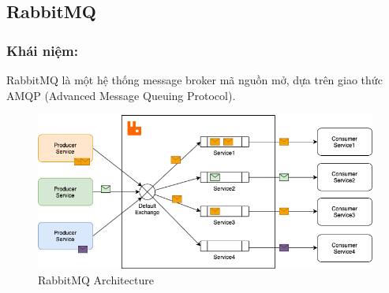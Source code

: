 \subsection{RabbitMQ}
\subsubsection{Khái niệm:}
\indent RabbitMQ là một hệ thống message broker mã nguồn mở, dựa trên giao thức AMQP (Advanced Message Queuing Protocol).
 \begin{figure}[H]
    \begin{center}
    \includegraphics[scale = 0.5]{images/chap-2-images/rabbitMQ.png}
    \vspace*{7mm}
    \caption{RabbitMQ Architecture}
    \end{center}
    \label{}
\end{figure}
